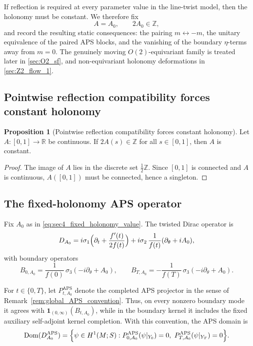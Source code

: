 \documentclass[11pt]{article}
\newcommand{\R}{\mathbb{R}}
\theoremstyle{definition}
\newtheorem{proposition}[theorem]{Proposition}
\DeclareMathOperator{\APS}{APS}
\DeclareMathOperator{\Dom}{Dom} \newcommand{\Z}{\mathbb{Z}} \DeclareMathOperator{\Ran}{Ran}
\numberwithin{equation}{section}
\begin{document}
If reflection is required at every parameter value in the line-twist model, then the
holonomy must be constant. We therefore fix
\begin{equation}\label{eq:sec4_fixed_holonomy_value}
A=A_0,
\qquad
2A_0\in\mathbb Z,
\end{equation}
and record the resulting static consequences: the pairing \(m\leftrightarrow -m\), the
unitary equivalence of the paired APS blocks, and the vanishing of the boundary
\(\eta\)-terms away from \(m=0\). The genuinely moving \(O(2)\)-equivariant family is
treated later in \autoref{sec:O2_sf}, and non-equivariant holonomy deformations in
\autoref{sec:Z2_flow_1}.

\subsection{Pointwise reflection compatibility forces constant holonomy}

\begin{proposition}[Pointwise reflection compatibility forces constant holonomy]
\label{prop:sec4_constant_holonomy}
Let \(A:[0,1]\to\R\) be continuous. If \(2A(s)\in\Z\) for all \(s\in[0,1]\), then \(A\) is constant.
\end{proposition}

\begin{proof}
The image of \(A\) lies in the discrete set \(\frac12\Z\). Since \([0,1]\) is connected and
\(A\) is continuous, \(A([0,1])\) must be connected, hence a singleton.
\end{proof}

\subsection{The fixed-holonomy APS operator}

Fix \(A_0\) as in \eqref{eq:sec4_fixed_holonomy_value}. The twisted Dirac operator is
\begin{equation}\label{eq:sec4_fixed_Dirac}
D_{A_0}
=
i\sigma_1\Bigl(\partial_t+\frac{f'(t)}{2f(t)}\Bigr)
+
i\sigma_2\,\frac{1}{f(t)}(\partial_\theta+iA_0),
\end{equation}
with boundary operators
\begin{equation}\label{eq:sec4_fixed_boundary_ops}
B_{0,A_0}
=
\frac{1}{f(0)}\,\sigma_3(-i\partial_\theta+A_0),
\qquad
B_{T,A_0}
=
-\frac{1}{f(T)}\,\sigma_3(-i\partial_\theta+A_0).
\end{equation}

For \(t\in\{0,T\}\), let \(P_{t,A_0}^{\APS}\) denote the completed APS projector in the sense of
Remark~\ref{rem:global_APS_convention}. Thus, on every nonzero boundary mode it agrees with
\(\mathbf 1_{(0,\infty)}(B_{t,A_0})\), while in the boundary kernel it includes the fixed auxiliary self-adjoint kernel completion. With this convention, the APS domain is
\begin{equation}\label{eq:sec4_fixed_APS_domain}
\Dom(D_{A_0}^{\APS})
=
\Bigl\{
\psi\in H^1(M;S):
P_{0,A_0}^{\APS}(\psi|_{Y_0})=0,\ 
P_{T,A_0}^{\APS}(\psi|_{Y_T})=0
\Bigr\}.
\end{equation}
\end{document}
